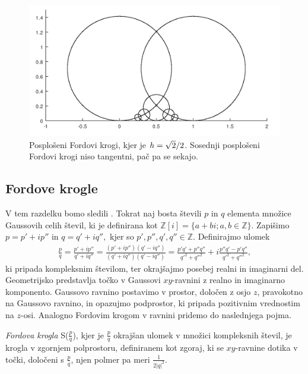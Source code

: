 \documentclass[mat1]{fmfdelo}
\newcommand{\Z}{\mathbb Z}
\begin{document}
\begin{figure}[h!]
\begin{center}
\includegraphics[scale=0.55]{posploseni_fordovi_krogi.png}
\caption{Posplošeni Fordovi krogi, kjer je $\protect{h=\sqrt{2}/2}$. Sosednji posplošeni Fordovi krogi niso tangentni, pač pa se sekajo.}
\label{Fig:PosplFord}
\end{center}
\end{figure}

\subsection{Fordove krogle}

V tem razdelku bomo sledili \cite[poglavje 8]{ford}.
Tokrat naj bosta števili $p$ in $q$ elementa množice Gaussovih celih števil, ki je definirana kot $\mathbb{Z}\left[{i}\right] = \{a+bi; a,b \in \Z \}.$ Zapišimo $p = p'+ip''$ in $q = q'+iq'',$ kjer so $p', p'', q', q'' \in \Z.$ Definirajmo ulomek
\begin{align} 
\frac{p}{q} = \frac{p'+ip''}{q'+iq''} = \frac{(p'+ip'')(q'-iq'')}{(q'+iq'')(q'-iq'')} = \frac{p'q'+p''q''}{q'^2+q''^2} + i \frac{p''q'-p'q''}{q'^2+q''^2},
\end{align}
ki pripada kompleksnim številom, ter okrajšajmo posebej realni in imaginarni del. Geometrijsko predstavlja točko v Gaussovi $xy$-ravnini z realno in imaginarno komponento. Gaussovo ravnino postavimo v prostor, določen z osjo $z$, pravokotno na Gaussovo ravnino, in opazujmo podprostor, ki pripada pozitivnim vrednostim na $z$-osi. Analogno Fordovim krogom v ravnini pridemo do naslednjega pojma. 

\begin{definicija}
\emph{Fordova krogla} S($\frac{p}{q}$), kjer je $\frac{p}{q}$ okrajšan ulomek v množici kompleksnih števil, je krogla v zgornjem polprostoru, definiranem kot zgoraj, ki se $xy$-ravnine dotika v točki, določeni s $\frac{p}{q}$, njen polmer pa meri $\frac{1}{2|q|^2}.$
\end{definicija}
\end{document}
